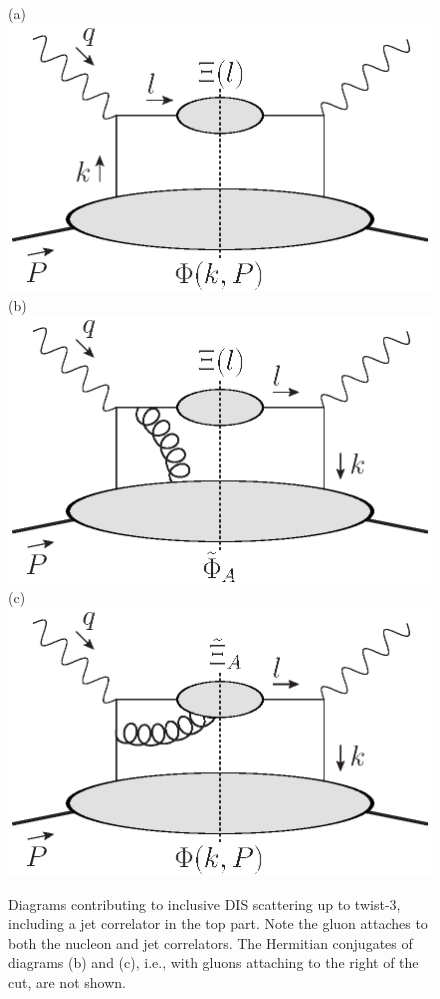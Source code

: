 \documentclass[preprintnumbers,floatfix,nofootinbib]{revtex4}
\begin{document}
\begin{figure}[bt]
  \centering
  (a)\includegraphics[width=0.3\linewidth,valign=t]{jetdiagram0.eps}
  \hfill
  (b)\includegraphics[width=0.3\linewidth,valign=t]{jetdiagram2.eps}
  \hfill
  (c)\includegraphics[width=0.3\linewidth,valign=t]{jetdiagram1.eps}
  \caption{Diagrams contributing to inclusive DIS scattering up to twist-3, including a jet correlator in the top part. Note the gluon attaches to both the nucleon and jet correlators. The Hermitian conjugates of diagrams (b) and (c), i.e., with gluons attaching to the right of the cut, are not shown.
  }
  \label{fig:handbags}
\end{figure}
\end{document}
